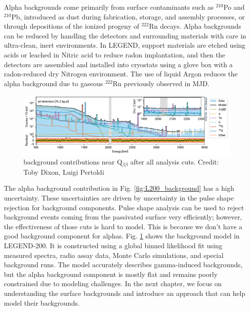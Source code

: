 Alpha backgrounds come primarily from surface contaminants such as $^{210}$Po and $^{210}$Pb, introduced as dust during fabrication, storage, and assembly processes, or through depositions of the ionized progeny of $^{222}$Rn decays. Alpha backgrounds can be reduced by handling the detectors and surrounding materials with care in ultra-clean, inert environments. In LEGEND, support materials are etched using acids or leached in Nitric acid to reduce radon implantation, and then the detectors are assembled and installed into cryostats using a glove box with a radon-reduced dry Nitrogen environment. The use of liquid Argon reduces the alpha background due to gaseous $^{222}$Rn previously observed in MJD.



\begin{figure}
\centering
  \includegraphics[width=0.99\linewidth]{ch2/figs/l200-bkgmodel-2_compressed.pdf}
  \caption{{\Ltwo} background contributions near Q$_{\beta\beta}$ after all analysis cuts. Credit: Toby Dixon, Luigi Pertoldi}
\label{ch2:fig:L200_background_model_fit}
  \end{figure}

  

 The alpha background contribution in Fig. \ref{fig:L200_background} has a  high uncertainty. These uncertainties are driven by uncertainty in the pulse shape rejection for background components. Pulse shape analysis can be used to reject background events coming from the passivated surface very efficiently; however, the effectiveness of those cuts is hard to model. This is because we don't have a good background component for alphas. Fig. \ref{ch2:fig:L200_background_model_fit} shows the background model in LEGEND-200. It is constructed using a global binned likelihood fit using measured spectra, radio assay data, Monte Carlo simulations, and special background runs. The model accurately describes gamma-induced backgrounds, but the alpha background component is mostly flat and remains poorly constrained due to modeling challenges. In the next chapter, we focus on understanding the surface backgrounds and introduce an approach that can help model their backgrounds.

